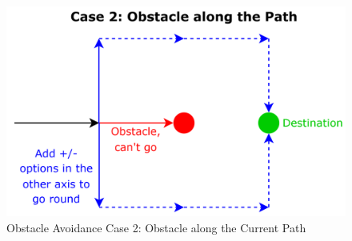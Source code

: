 \begin{figure} [H]
    \centering
    \includegraphics[width=0.75\linewidth]{midpoint_report/assets/images/formation/obstacle-avoidance-case2.png}
    \caption{Obstacle Avoidance Case 2: Obstacle along the Current Path}
    \label{fig:obstacle-avoidance-case-2}
\end{figure}

